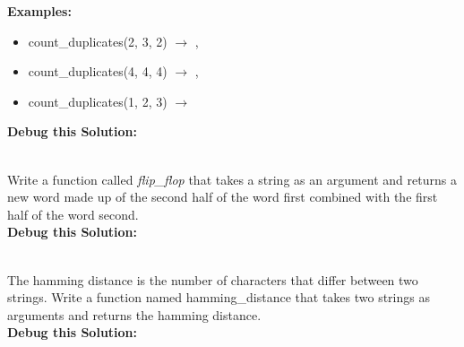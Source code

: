 		\textbf{Examples:}		
		\begin{itemize}
			\item  count\_duplicates(2, 3, 2) $\rightarrow$ , 
			\item  count\_duplicates(4, 4, 4) $\rightarrow$ , 
			\item  count\_duplicates(1, 2, 3) $\rightarrow$  
		\end{itemize}

		\textbf{Debug this Solution:}\\
		\mbox{ \hspace*{0.25in}	}

\pagebreak




	\item
		Write a function called \textit{flip\_flop} that takes a string as an argument 
		and returns a new word made up of the second half of the word first combined 
		with the first half of the word second.\\ 

		\textbf{Debug this Solution:}\\
		\mbox{ \hspace*{0.25in}	}

\pagebreak



	\item 
		The hamming distance is the number of characters that differ between two strings. 
		Write a function named hamming\_distance that takes two strings as arguments and 
		returns the hamming distance.\\
		
		\textbf{Debug this Solution:}\\
		\mbox{ \hspace*{0.25in}	}

\pagebreak



